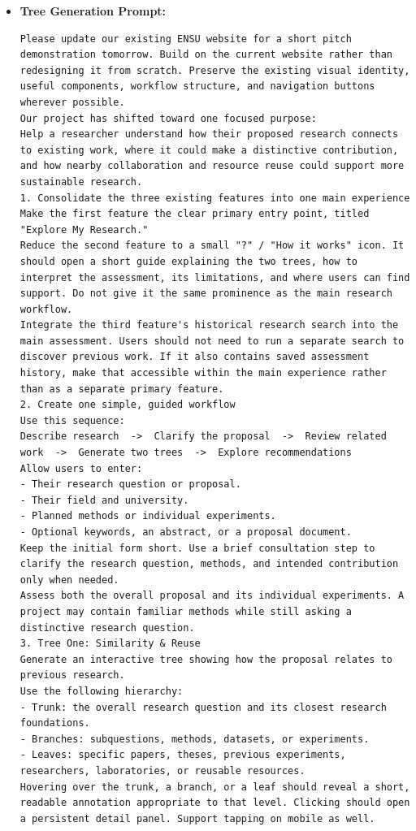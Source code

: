\documentclass[11pt,a4paper]{article}
\begin{document}
\begin{itemize}[leftmargin=*]
    \item \textbf{Tree Generation Prompt:}
    \begin{lstlisting}
Please update our existing ENSU website for a short pitch demonstration tomorrow. Build on the current website rather than redesigning it from scratch. Preserve the existing visual identity, useful components, workflow structure, and navigation buttons wherever possible.
Our project has shifted toward one focused purpose:
Help a researcher understand how their proposed research connects to existing work, where it could make a distinctive contribution, and how nearby collaboration and resource reuse could support more sustainable research.
1. Consolidate the three existing features into one main experience
Make the first feature the clear primary entry point, titled "Explore My Research."
Reduce the second feature to a small "?" / "How it works" icon. It should open a short guide explaining the two trees, how to interpret the assessment, its limitations, and where users can find support. Do not give it the same prominence as the main research workflow.
Integrate the third feature's historical research search into the main assessment. Users should not need to run a separate search to discover previous work. If it also contains saved assessment history, make that accessible within the main experience rather than as a separate primary feature.
2. Create one simple, guided workflow
Use this sequence:
Describe research  ->  Clarify the proposal  ->  Review related work  ->  Generate two trees  ->  Explore recommendations
Allow users to enter:
- Their research question or proposal.
- Their field and university.
- Planned methods or individual experiments.
- Optional keywords, an abstract, or a proposal document.
Keep the initial form short. Use a brief consultation step to clarify the research question, methods, and intended contribution only when needed.
Assess both the overall proposal and its individual experiments. A project may contain familiar methods while still asking a distinctive research question.
3. Tree One: Similarity & Reuse
Generate an interactive tree showing how the proposal relates to previous research.
Use the following hierarchy:
- Trunk: the overall research question and its closest research foundations.
- Branches: subquestions, methods, datasets, or experiments.
- Leaves: specific papers, theses, previous experiments, researchers, laboratories, or reusable resources.
Hovering over the trunk, a branch, or a leaf should reveal a short, readable annotation appropriate to that level. Clicking should open a persistent detail panel. Support tapping on mobile as well.

\end{lstlisting}
\end{itemize}
\end{document}

